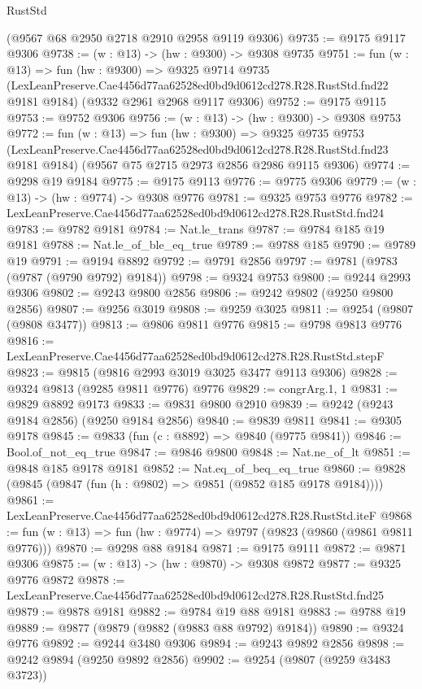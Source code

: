 \begin{lexlean}{RustStd}
\begin{coremodule}
    (@9567 @68 @2950 @2718 @2910 @2958 @9119 @9306)
@9735 := @9175 @9117 @9306
@9738 := (w : @13) -> (hw : @9300) -> @9308 @9735
@9751 := fun (w : @13) =>
  fun (hw : @9300) =>
  @9325
    @9714
    @9735
    (LexLeanPreserve.Cae4456d77aa62528ed0bd9d0612cd278.R28.RustStd.fnd22 @9181 @9184)
    (@9332 @2961 @2968 @9117 @9306)
@9752 := @9175 @9115
@9753 := @9752 @9306
@9756 := (w : @13) -> (hw : @9300) -> @9308 @9753
@9772 := fun (w : @13) =>
  fun (hw : @9300) =>
  @9325
    @9735
    @9753
    (LexLeanPreserve.Cae4456d77aa62528ed0bd9d0612cd278.R28.RustStd.fnd23 @9181 @9184)
    (@9567 @75 @2715 @2973 @2856 @2986 @9115 @9306)
@9774 := @9298 @19 @9184
@9775 := @9175 @9113
@9776 := @9775 @9306
@9779 := (w : @13) -> (hw : @9774) -> @9308 @9776
@9781 := @9325 @9753 @9776
@9782 := LexLeanPreserve.Cae4456d77aa62528ed0bd9d0612cd278.R28.RustStd.fnd24
@9783 := @9782 @9181
@9784 := Nat.le_trans
@9787 := @9784 @185 @19 @9181
@9788 := Nat.le_of_ble_eq_true
@9789 := @9788 @185
@9790 := @9789 @19
@9791 := @9194 @8892
@9792 := @9791 @2856
@9797 := @9781 (@9783 (@9787 (@9790 @9792) @9184))
@9798 := @9324 @9753
@9800 := @9244 @2993 @9306
@9802 := @9243 @9800 @2856
@9806 := @9242 @9802 (@9250 @9800 @2856)
@9807 := @9256 @3019
@9808 := @9259 @3025
@9811 := @9254 (@9807 (@9808 @3477))
@9813 := @9806 @9811 @9776
@9815 := @9798 @9813 @9776
@9816 := LexLeanPreserve.Cae4456d77aa62528ed0bd9d0612cd278.R28.RustStd.stepF
@9823 := @9815 (@9816 @2993 @3019 @3025 @3477 @9113 @9306)
@9828 := @9324 @9813 (@9285 @9811 @9776) @9776
@9829 := congrArg.{1, 1}
@9831 := @9829 @8892 @9173
@9833 := @9831 @9800 @2910
@9839 := @9242 (@9243 @9184 @2856) (@9250 @9184 @2856)
@9840 := @9839 @9811
@9841 := @9305 @9178
@9845 := @9833 (fun (c : @8892) => @9840 (@9775 @9841))
@9846 := Bool.of_not_eq_true
@9847 := @9846 @9800
@9848 := Nat.ne_of_lt
@9851 := @9848 @185 @9178 @9181
@9852 := Nat.eq_of_beq_eq_true
@9860 := @9828 (@9845 (@9847 (fun (h : @9802) => @9851 (@9852 @185 @9178 @9184))))
@9861 := LexLeanPreserve.Cae4456d77aa62528ed0bd9d0612cd278.R28.RustStd.iteF
@9868 := fun (w : @13) => fun (hw : @9774) => @9797 (@9823 (@9860 (@9861 @9811 @9776)))
@9870 := @9298 @88 @9184
@9871 := @9175 @9111
@9872 := @9871 @9306
@9875 := (w : @13) -> (hw : @9870) -> @9308 @9872
@9877 := @9325 @9776 @9872
@9878 := LexLeanPreserve.Cae4456d77aa62528ed0bd9d0612cd278.R28.RustStd.fnd25
@9879 := @9878 @9181
@9882 := @9784 @19 @88 @9181
@9883 := @9788 @19
@9889 := @9877 (@9879 (@9882 (@9883 @88 @9792) @9184))
@9890 := @9324 @9776
@9892 := @9244 @3480 @9306
@9894 := @9243 @9892 @2856
@9898 := @9242 @9894 (@9250 @9892 @2856)
@9902 := @9254 (@9807 (@9259 @3483 @3723))

\end{coremodule}
\end{lexlean}

